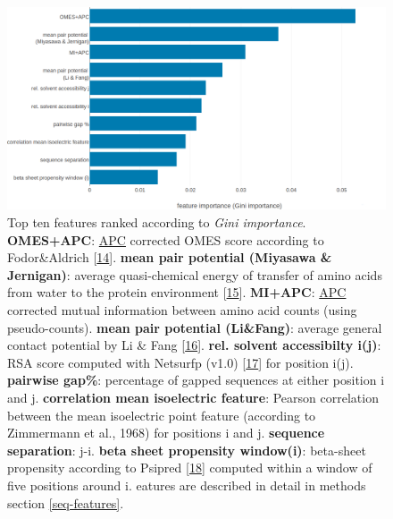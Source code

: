 \documentclass[12pt,a4paper,twoside]{book}
\theoremstyle{definition}
\theoremstyle{definition}
\theoremstyle{remark}
\begin{document}
\begin{figure}
\includegraphics[width=1\linewidth]{img/random_forest_contact_prior/feature_random_forest_optimalhyperparameters_topfeatures} \caption{Top ten features ranked according to
\emph{Gini importance}. \textbf{OMES+APC}:
\protect\hyperlink{abbrev}{APC} corrected OMES score according to
Fodor\&Aldrich {[}\protect\hyperlink{ref-Fodor2004a}{14}{]}.
\textbf{mean pair potential (Miyasawa \& Jernigan)}: average
quasi-chemical energy of transfer of amino acids from water to the
protein environment {[}\protect\hyperlink{ref-Miyazawa1999a}{15}{]}.
\textbf{MI+APC}: \protect\hyperlink{abbrev}{APC} corrected mutual
information between amino acid counts (using pseudo-counts).
\textbf{mean pair potential (Li\&Fang)}: average general contact
potential by Li \& Fang {[}\protect\hyperlink{ref-Li2011}{16}{]}.
\textbf{rel. solvent accessibilty i(j)}: RSA score computed with
Netsurfp (v1.0) {[}\protect\hyperlink{ref-Petersen2009a}{17}{]} for
position i(j). \textbf{pairwise gap\%}: percentage of gapped sequences
at either position i and j. \textbf{correlation mean isoelectric
feature}: Pearson correlation between the mean isoelectric point feature
(according to Zimmermann et al., 1968) for positions i and j.
\textbf{sequence separation}: \textbar{}j-i\textbar{}. \textbf{beta
sheet propensity window(i)}: beta-sheet propensity according to Psipred
{[}\protect\hyperlink{ref-Jones1999}{18}{]} computed within a window of
five positions around i. eatures are described in detail in methods
section \ref{seq-features}.}\label{fig:rf-feature-importance}
\end{figure}
\end{document}
